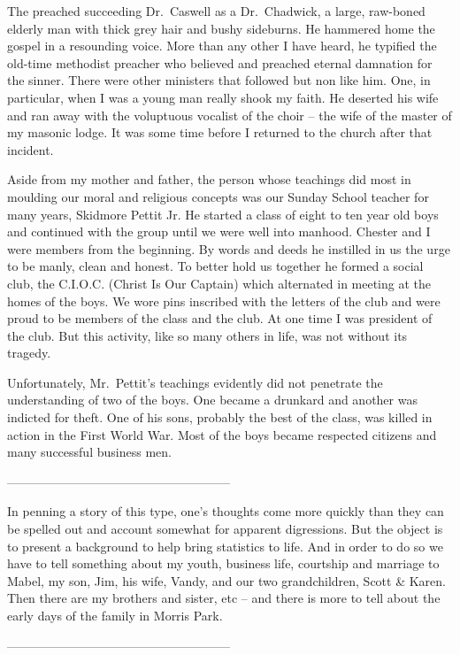 \documentclass[12pt]{book}              %
\begin{document}
The preached succeeding Dr.~Caswell as a Dr.~Chadwick, a large, raw-boned elderly man with thick grey hair and bushy sideburns. He hammered home the gospel in a resounding voice. More than any other I have heard, he typified the old-time methodist preacher who believed and preached eternal damnation for the sinner. There were other ministers that followed but non like him. One, in particular, when I was a young man really shook my faith. He deserted his wife and ran away with the voluptuous vocalist of the choir -- the wife of the master of my masonic lodge. It was some time before I returned to the church after that incident. 

Aside from my mother and father, the person whose teachings did most in moulding our moral and religious concepts was our Sunday School teacher for many years, Skidmore Pettit Jr. He started a class of eight to ten year old boys and continued with the group until we were well into manhood. Chester and I were members from the beginning. By words and deeds he instilled in us the urge to be manly, clean and honest. To better hold us together he formed a social club, the C.I.O.C. (Christ Is Our Captain) which alternated in meeting at the homes of the boys. We wore pins inscribed with the letters of the club and were proud to be members of the class and the club. At one time I was president of the club. But this activity, like so many others in life, was not without its tragedy. 

Unfortunately, Mr.~Pettit's teachings evidently did not penetrate the understanding of two of the boys. One became a drunkard and another was indicted for theft. One of his sons, probably the best of the class, was killed in action in the First World War. Most of the boys became respected citizens and many successful business men. 

\begin{center}
------------------------------------------------------
\end{center}
In penning a story of this type, one's thoughts come more quickly than they can be spelled out and account somewhat for apparent digressions. But the object is to present a background to help bring statistics to life. And in order to do so we have to tell something about my youth, business life, courtship and marriage to Mabel, my son, Jim, his wife, Vandy, and our two grandchildren, Scott \& Karen. Then there are my brothers and sister, etc -- and there is more to tell about the early days of the family in Morris Park. 
\begin{center}
------------------------------------------------------
\end{center}
\end{document}
